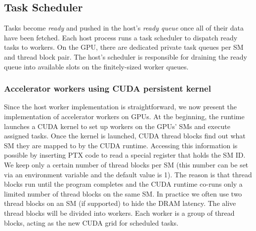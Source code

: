 \subsection{Task Scheduler}
Tasks become {\em ready} and pushed in the host's {\em ready queue} once all of their data have been fetched.
Each host process runs a task scheduler to dispatch ready tasks to workers. On the GPU, there are
dedicated private task queues per SM and thread block pair. The host's scheduler is responsible
for draining the ready queue into available slots on the finitely-sized worker queues.


\subsubsection{Accelerator workers using CUDA persistent kernel}
Since the host worker implementation is straightforward, we now present the implementation of accelerator workers on GPUs.
At the beginning, the runtime launches a CUDA kernel to set up workers on the GPUs' SMs and execute assigned tasks.
Once the kernel is launched, CUDA thread blocks find out what SM they are mapped to by the CUDA runtime.
Accessing this information is possible by inserting PTX code to read a special register that holds the SM ID.
We keep only a certain number of thread blocks per SM (this number can be set via an environment variable and the default value is 1).
The reason is that thread blocks run until the program completes and the CUDA runtime co-runs only a limited number of thread blocks on the same SM.
In practice we often use two thread blocks on an SM (if supported) to hide the DRAM latency.
The alive thread blocks will be divided into workers.
Each worker is a group of thread blocks, acting as the new CUDA grid for scheduled tasks.

